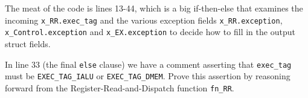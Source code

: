 The meat of the code is lines 13-44, which is a big if-then-else that
examines the incoming \verb|x_RR.exec_tag| and the various exception
fields \verb|x_RR.exception|, \verb|x_Control.exception| and
\verb|x_EX.exception| to decide how to fill in the output struct
fields.

\hdivider

\Exercise

In line 33 (the final \verb|else| clause) we have a comment asserting
that \verb|exec_tag| must be \verb|EXEC_TAG_IALU| or
\verb|EXEC_TAG_DMEM|.  Prove this assertion by reasoning forward from
the Register-Read-and-Dispatch function \verb|fn_RR|.

\Endexercise

